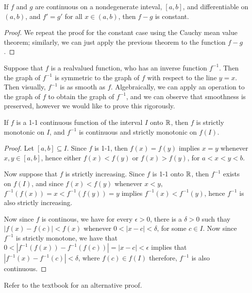 \begin{remark}
    If $f$ and  $g$ are continuous on a nondegenerate inteval,  $[a,b]$, and differentiable 
    on  $(a,b)$, and  $f'=g'$ for all  $x \in (a,b)$, then $f-g$ is constant.
\end{remark}
\begin{proof}
    We repeat the proof for the constant case using the Cauchy mean value theorem; 
    similarly, we can just apply the previous theorem to the function $f-g$.
\end{proof}

Suppose that $f$ is a realvalued function, who has an inverse function  $f^{-1}$. Then 
the graph of  $f^{-1}$ is symmetric to the graph of  $f$ with respect to the line  $y=x$. Then 
visually,  $f^{-1}$ is as smooth as  $f$. Algebraically, we can apply an operation to the graph 
of $f$ to obtain the graph of  $f^{-1}$, and we can observe that smoothness is preserved, however 
we would like to prove this rigorously.

\begin{theorem}\label{4.4.2}
    If $f$ is a  1-1 continuous function of the interval  $I$ onto $\mathbb{R}$, 
    then  $f$ is strictly monotonic on  $I$, and  $f^{-1}$ is continuous and strictly 
    monotonic on $f(I)$.
\end{theorem}
\begin{proof}
    Let $[a,b] \subseteq I$. Since $f$ is  1-1, then $f(x)=f(y)$ implies $x=y$ whenever 
    $x,y \in [a,b]$, hence either $f(x)<f(y)$ or $f(x)>f(y)$, for  $a<x<y<b$.

    Now suppose that $f$ is strictly increasing. Since  $f$ is 1-1 onto  $\mathbb{R}$, then  $f^{-1}$ 
    exists on $f(I)$, and since  $f(x)<f(y)$ whenever  $x<y$, $f^{-1}(f(x))=x<f^{-1}(f(y))=y$ 
    implies  $f^{-1}(x)<f^{-1}(y)$, hence  $f^{-1}$ is also strictly increasing.

    Now since $f$ is continous, we have for every  $\epsilon>0$, there is a $\delta>0$ such 
    thay  $|f(x)-f(c)|<f(x)$ whenever  $0<|x-c|<\delta$, for some  $c \in I$. Now since  $f^{-1}$ 
    is strictly monotone, we have that  $0<|f^{-1}(f(x))-f^{-1}(f(c))|=|x-c|<\epsilon$ implies 
    that  $|f^{-1}(x)-f^{-1}(c)|<\delta$, where $f(c) \in f(I)$ therefore,  $f^{-1}$ is also 
    continuous.
\end{proof}

\begin{remark}
    Refer to the textbook for an alternative proof.
\end{remark}

